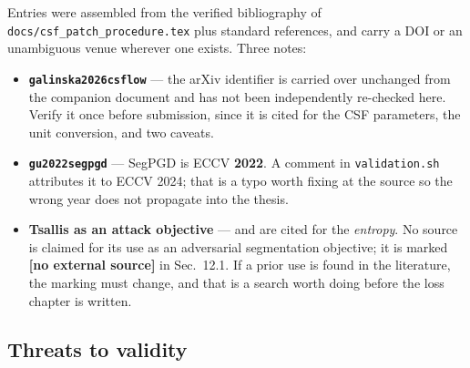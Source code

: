 \documentclass[11pt,a4paper]{article}
\newcommand{\novel}{\textbf{[no external source]}}
\begin{document}
Entries were assembled from the verified bibliography of
\texttt{docs/csf\_patch\_procedure.tex} plus standard references, and carry
a DOI or an unambiguous venue wherever one exists. Three notes:
\begin{itemize}
\item \textbf{\texttt{galinska2026csflow}} --- the arXiv identifier is
  carried over unchanged from the companion document and has not been
  independently re-checked here. Verify it once before submission, since it
  is cited for the CSF parameters, the unit conversion, and two caveats.
\item \textbf{\texttt{gu2022segpgd}} --- SegPGD is ECCV \textbf{2022}. A
  comment in \texttt{validation.sh} attributes it to ECCV 2024; that is a
  typo worth fixing at the source so the wrong year does not propagate into
  the thesis.
\item \textbf{Tsallis as an attack objective} --- \citet{tsallis1988} and
  \citet{havrda1967} are cited for the \emph{entropy}. No source is claimed
  for its use as an adversarial segmentation objective; it is marked
  \novel{} in Sec.~12.1. If a prior use is found in the literature, the
  marking must change, and that is a search worth doing before the loss
  chapter is written.
\end{itemize}

\subsection{Threats to validity}
\end{document}
